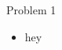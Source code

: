 \documentclass[11pt]{article}
\begin{document}



\begin{solution}
Problem 1
\begin{itemize}
\item hey
\end{itemize}
\end{solution}
\end{document}
